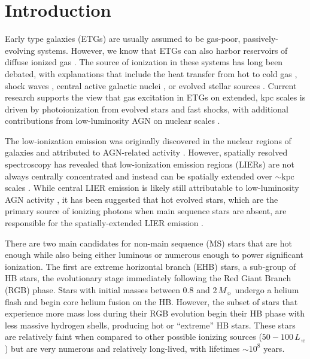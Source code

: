 \documentclass[preprint2]{aastex62}
\newcommand\Lsun{\ensuremath{\,L_{\sun}}\xspace}
\newcommand\Msun{\ensuremath{\,M_{\sun}}\xspace}
\begin{document}
\section{Introduction} \label{sec:intro}

Early type galaxies (ETGs) are usually assumed to be gas-poor, passively-evolving systems. However, we know that ETGs can also harbor reservoirs of diffuse ionized gas \citep[e.g.,][]{Sarzi+2006, Singh+2013, Kehrig+2012, Papaderos+2013}. The source of ionization in these systems has long been debated, with explanations that include the heat transfer from hot to cold gas \citep{Heckman+1981}, shock waves \citep{Koski+1976, Dopita+1995, Allen+2008}, central active galactic nuclei \citep[AGN; ][]{Ferland+1983, Halpern+1983, Heckman+1998, Ho+1999, Kauffmann+2003b, Kewley+2006, Ho+2009}, or evolved stellar sources \citep{Binette+1994, Taniguchi+2000}. Current research supports the view that gas excitation in ETGs on extended, kpc scales is driven by photoionization from evolved stars and fast shocks, with additional contributions from low-luminosity AGN on nuclear scales \citep[e.g., ][]{Pandya+2017}.

The low-ionization emission was originally discovered in the nuclear regions of galaxies and attributed to AGN-related activity \citep[for a recent review, see][]{Filippenko+2003}. However, spatially resolved spectroscopy has revealed that low-ionization emission regions (LIERs) are not always centrally concentrated and instead can be spatially extended over ${\sim}\mathrm{kpc}$ scales \citep{Goudfrooij+1994, Maccehetto+1996, Sharp+2010, Kehrig+2012, Papaderos+2013, Singh+2013, James+2015, Belfiore+2016, Gomes+2016}. While central LIER emission is likely still attributable to low-luminosity AGN activity \citep[e.g.,][]{Kormendy+2013}, it has been suggested that hot evolved stars, which are the primary source of ionizing photons when main sequence stars are absent, are responsible for the spatially-extended LIER emission \citep{Binette+1994, Stasinska+2008, Sarzi+2010, Yan+2012, Woods+2014, Johansson+2016}.

There are two main candidates for non-main sequence (MS) stars that are hot enough while also being either luminous or numerous enough to power significant ionization. The first are extreme horizontal branch (EHB) stars, a sub-group of HB stars, the evolutionary stage immediately following the Red Giant Branch (RGB) phase. Stars with initial masses between 0.8 and 2\Msun undergo a helium flash and begin core helium fusion on the HB. However, the subset of stars that experience more mass loss during their RGB evolution begin their HB phase with less massive hydrogen shells, producing hot or ``extreme'' HB stars. These stars are relatively faint when compared to other possible ionizing sources ($50-100$\Lsun) but are very numerous and relatively long-lived, with lifetimes $\sim 10^8$ years. 
\end{document}
